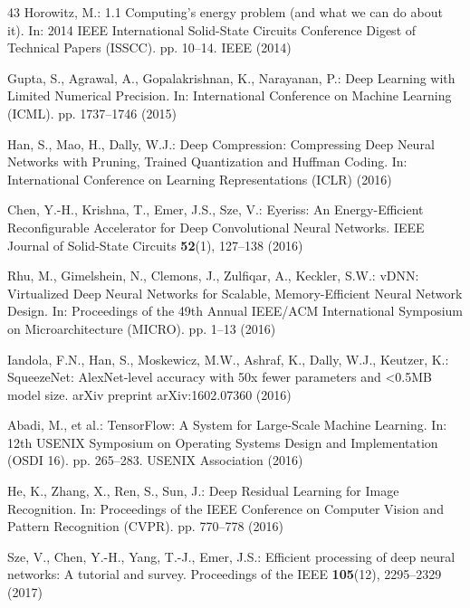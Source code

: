 \documentclass[conference]{IEEEtran}
\begin{document}
\begin{thebibliography}{43}
Horowitz, M.: 1.1 Computing's energy problem (and what we can do about it). In: 2014 IEEE International Solid-State Circuits Conference Digest of Technical Papers (ISSCC). pp. 10--14. IEEE (2014)


Gupta, S., Agrawal, A., Gopalakrishnan, K., Narayanan, P.: Deep Learning with Limited Numerical Precision. In: International Conference on Machine Learning (ICML). pp. 1737--1746 (2015)


Han, S., Mao, H., Dally, W.J.: Deep Compression: Compressing Deep Neural Networks with Pruning, Trained Quantization and Huffman Coding. In: International Conference on Learning Representations (ICLR) (2016)


Chen, Y.-H., Krishna, T., Emer, J.S., Sze, V.: Eyeriss: An Energy-Efficient Reconfigurable Accelerator for Deep Convolutional Neural Networks. IEEE Journal of Solid-State Circuits \textbf{52}(1), 127--138 (2016)


Rhu, M., Gimelshein, N., Clemons, J., Zulfiqar, A., Keckler, S.W.: vDNN: Virtualized Deep Neural Networks for Scalable, Memory-Efficient Neural Network Design. In: Proceedings of the 49th Annual IEEE/ACM International Symposium on Microarchitecture (MICRO). pp. 1--13 (2016)


Iandola, F.N., Han, S., Moskewicz, M.W., Ashraf, K., Dally, W.J., Keutzer, K.: SqueezeNet: AlexNet-level accuracy with 50x fewer parameters and <0.5MB model size. arXiv preprint arXiv:1602.07360 (2016)


Abadi, M., et al.: TensorFlow: A System for Large-Scale Machine Learning. In: 12th USENIX Symposium on Operating Systems Design and Implementation (OSDI 16). pp. 265--283. USENIX Association (2016)


He, K., Zhang, X., Ren, S., Sun, J.: Deep Residual Learning for Image Recognition. In: Proceedings of the IEEE Conference on Computer Vision and Pattern Recognition (CVPR). pp. 770--778 (2016)


Sze, V., Chen, Y.-H., Yang, T.-J., Emer, J.S.: Efficient processing of deep neural networks: A tutorial and survey. Proceedings of the IEEE \textbf{105}(12), 2295--2329 (2017)


\end{thebibliography}
\end{document}
